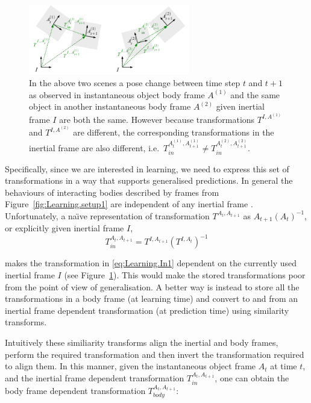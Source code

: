 \begin{figure}[b]
\centerline{\includegraphics[width=7.0cm]{body1}}
\caption[Transformations in the inertial frame]{In the above two scenes
a pose change between time step $t$ and $t+1$ as observed in
instantaneous object body frame $A^{(1)}$ and the same object in
another instantaneous body frame $A^{(2)}$ given inertial
frame $I$ are both the same.
However because transformations $T^{I, A^{(1)}}$ and
$T^{I, A^{(2)}}$ are different,
the corresponding transformations in the inertial frame are also different,
i.e.\ $T_{in}^{A^{(1)}_{t}, A^{(1)}_{t+1}} \neq T_{in}^{A^{(2)}_{t}, A^{(2)}_{t+1}}$.}
\label{fig:Learning.Body1}
\end{figure}

Specifically, since we are interested in learning, we need to express this set of transformations in a way that supports generalised predictions. In general the behaviours of interacting bodies described by frames from Figure~\ref{fig:Learning.setup1} are independent of any inertial frame \cite{kopicki_prediction_2010}. Unfortunately, a na\"{\i}ve representation of transformation $T^{A_{t}, A_{t+1}}$ as $A_{t+1}(A_{t})^{-1}$, or explicitly given inertial frame $I$,
\begin{equation}
T_{in}^{A_{t}, A_{t+1}} = T^{I, A_{t+1}} (T^{I, A_{t}})^{-1}
\label{eq:Learning.In1}
\end{equation}

\noindent makes the transformation in \eqref{eq:Learning.In1} dependent on the currently used inertial frame $I$ (see
Figure~\ref{fig:Learning.Body1}).  This would make the stored transformations poor from the point of view of generalisation. A better way is instead to store all the transformations in a body frame (at learning time) and convert to and from an inertial frame dependent transformation (at prediction time) using similarity transforms.

Intuitively these similiarity transforms align the inertial and body frames, perform the
required transformation and then invert the transformation required to
align them. In this manner, given the instantaneous object frame
$A_{t}$ at time $t$, and the inertial frame dependent transformation
$T_{in}^{A_{t}, A_{t+1}}$, one can obtain the body frame dependent
transformation $T_{body}^{A_{t}, A_{t+1}}$:

